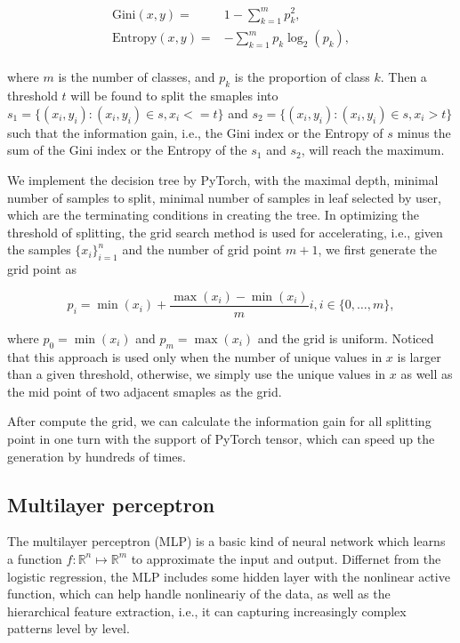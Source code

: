 \documentclass[11pt]{article}
\begin{document}
$$
  \begin{aligned}
    \text{Gini} (x, y) =    & 1 - \sum_{k=1}^m p_k^2,          \\
    \text{Entropy} (x, y) = & - \sum_{k=1}^m p_k \log_2 (p_k), \\
  \end{aligned}
$$

\noindent where $m$ is the number of classes, and $p_k$ is the proportion of class $k$. Then a threshold $t$ will be found to split the smaples into $s_1 = \{(x_i, y_i): (x_i, y_i) \in s, x_i <= t \}$ and $s_2 = \{(x_i, y_i): (x_i, y_i) \in s, x_i > t \}$ such that the information gain, i.e., the Gini index or the Entropy of $s$ minus the sum of the Gini index or the Entropy of the $s_1$ and $s_2$, will reach the maximum.

We implement the decision tree by PyTorch, with the maximal depth, minimal number of samples to split, minimal number of samples in leaf selected by user, which are the terminating conditions in creating the tree. In optimizing the threshold of splitting, the grid search method is used for accelerating, i.e., given the samples $\{x_i\}_{i=1}^n$ and the number of grid point $m + 1$, we first generate the grid point as

$$
  p_i = \min(x_i) + \frac{\max(x_i) - \min(x_i)}{m} i, i \in \{0, \dots, m\},
$$

\noindent where $p_0 = \min(x_i)$ and $p_{m} = \max(x_i)$ and the grid is uniform. Noticed that this approach is used only when the number of unique values in $x$ is larger than a given threshold, otherwise, we simply use the unique values in $x$ as well as the mid point of two adjacent smaples as the grid.

After compute the grid, we can calculate the information gain for all splitting point in one turn with the support of PyTorch tensor, which can speed up the generation by hundreds of times.

\subsection{Multilayer perceptron}

The multilayer perceptron (MLP) is a basic kind of neural network which learns a function $f: \mathbb{R}^n \mapsto \mathbb{R}^m$ to approximate the input and output. Differnet from the logistic regression, the MLP includes some hidden layer with the nonlinear active function, which can help handle nonlineariy of the data, as well as the hierarchical feature extraction, i.e., it can capturing increasingly complex patterns level by level.
\end{document}
